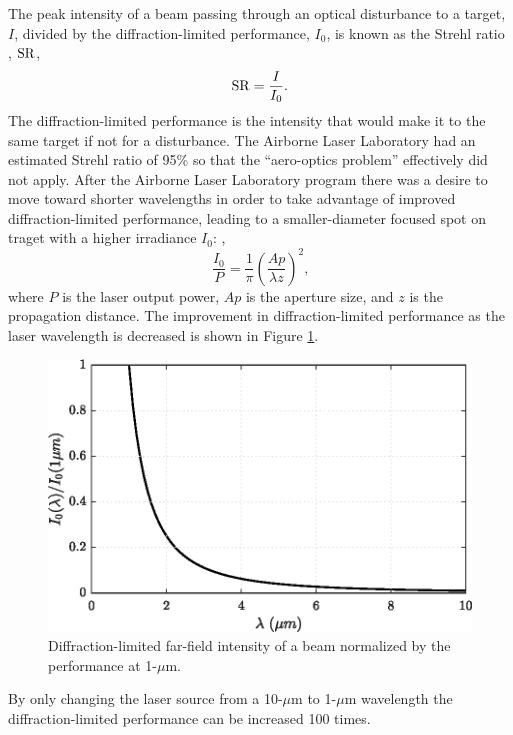 The peak intensity of a beam passing through an optical disturbance to a target, $I$, divided by the diffraction-limited performance, $I_0$, is known as the Strehl ratio \cite{Mahajan-1982-kkXM4eaB}, $\operatorname{SR}$,
\begin{equation}
  \operatorname{SR} = \frac{I}{I_0} \textrm{.}
  \label{eqn:01_strehl_ratio_definition}
\end{equation}
The diffraction-limited performance is the intensity that would make it to the same target if not for a disturbance.
The Airborne Laser Laboratory had an estimated Strehl ratio of 95\%\cite{Jumper-2013-8KtN3pue} so that the ``aero-optics problem'' effectively did not apply.
After the Airborne Laser Laboratory program there was a desire to move toward shorter wavelengths in order to take advantage of improved diffraction-limited performance, leading to a smaller-diameter focused spot on traget with a higher irradiance $I_0$: \cite{Jumper-2001-6QDh7zDy},
\begin{equation}
  \frac{I_0}{P} = \frac{1}{\pi}\left(\frac{Ap}{\lambda z}\right)^2 \textrm{,}
  \label{eqn:01_farfield_intensity}
\end{equation}
where $P$ is the laser output power, $Ap$ is the aperture size, and $z$ is the propagation distance.
The improvement in diffraction-limited performance as the laser wavelength is decreased is shown in Figure \ref{fig:01_farfield_intensity}.
\begin{figure}
  \centering
  \includegraphics{../matlab/01_introduction/farfield_intensity.eps}
  \caption{Diffraction-limited far-field intensity of a beam normalized by the performance at 1-$\mu$m.}
  \label{fig:01_farfield_intensity}
\end{figure}
By only changing the laser source from a 10-$\mu$m to 1-$\mu$m wavelength the diffraction-limited performance can be increased 100 times.

